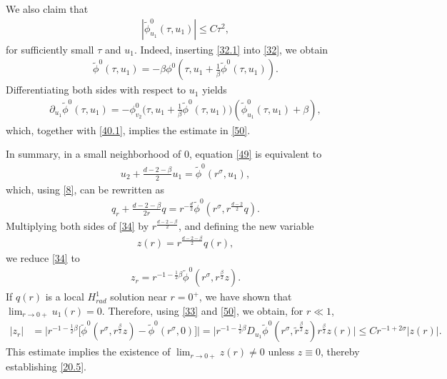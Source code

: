 \documentclass[12pt]{amsart}
\begin{document}
We also claim that
\begin{align}\label{50}
|\tilde \phi^0_{u_1}(\tau, u_1)|\le C\tau ^2,
\end{align}
for sufficiently small $\tau$ and $u_1$. Indeed, inserting \eqref{32.1} into \eqref{32}, we obtain
\begin{align*}
\tilde \phi^0(\tau, u_1)=-\beta \phi^0(\tau, u_1+\tfrac 1\beta \tilde \phi^0(\tau, u_1)). 
\end{align*}
Differentiating both sides with respect to $u_1$ yields 
\begin{align*}
\partial_{u_1}\tilde \phi^0(\tau, u_1)=-\phi_{v_2}^0\bigl (\tau, u_1+\tfrac 1\beta\tilde \phi^0(\tau, u_1)\bigr)(\tilde \phi_{u_1}^0(\tau, u_1)+\beta), 
\end{align*}
which, together with \eqref{40.1}, implies the estimate in \eqref{50}. 

In summary, in a small neighborhood of $0$, 
equation \eqref{49} is equivalent to 
\begin{align*}
u_2+\tfrac{d-2-\beta}2 u_1=\tilde \phi^0(r^\sigma, u_1), 
\end{align*}
which, using \eqref{8}, can be rewritten as
\begin{align}\label{34}
q_r+\tfrac{d-2-\beta}{2r}q=r^{-\frac d2}\tilde \phi^0(r^\sigma, r^{\frac{d-2}2}q).
\end{align}
 Multiplying both sides of \eqref{34} by $r^{\frac{d-2-\beta}2}$, and defining the new variable 
\begin{align}\label{34.1}
z(r)=r^{\frac{d-2-\beta}2}q(r),
\end{align}
we reduce \eqref{34} to 
\begin{align}\label{34.2}
z_r=r^{-1-\frac 12\beta}\tilde \phi^0(r^\sigma, r^{\frac \beta 2}z). 
\end{align}
If $q(r)$ is a local $H_{rad}^1$ solution near $r=0^+$, we have shown that $\lim_{r\to 0+} u_1(r) =0$. Therefore, using \eqref{33} and \eqref{50}, we obtain, for $r\ll1$, 
\begin{align}
|z_r|&=\bigl| r^{-1-\frac 12 \beta}\bigl[\tilde \phi^0(r^\sigma, r^{\frac \beta 2} z)-\tilde \phi^0(r^\sigma, 0)
\bigr]\bigr| =\bigl |r^{-1-\frac 12 \beta}D_{u_1}\tilde \phi^0(r^\sigma, \tilde r^{\frac\beta 2}z) r^{\frac \beta 2}z(r)\bigl| \le Cr^{-1+2\sigma}|z(r)|.\label{1210}
\end{align}
This estimate implies the existence of $\lim_{r\to 0+} z(r) \ne 0$ unless $z \equiv 0$, thereby establishing \eqref{20.5}.
\end{document}
